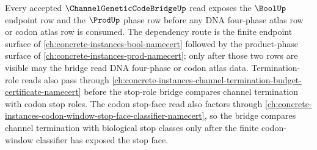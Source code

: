 \begin{lemma}
\label{lem:channel-genetic-code-bridge-finite-endpoint-dependency-route}
Every accepted $\ChannelGeneticCodeBridgeUp$ read exposes the $\BoolUp$ endpoint row and the $\ProdUp$ phase row before any DNA four-phase atlas row or codon atlas row is consumed. The dependency route is the finite endpoint surface of \autoref{ch:concrete-instances-bool-namecert} followed by the product-phase surface of \autoref{ch:concrete-instances-prod-namecert}; only after those two rows are visible may the bridge read DNA four-phase or codon atlas data. Termination-role reads also pass through \autoref{ch:concrete-instances-channel-termination-budget-certificate-namecert} before the stop-role bridge compares channel termination with codon stop roles. The codon stop-face read also factors through \autoref{ch:concrete-instances-codon-window-stop-face-classifier-namecert}, so the bridge compares channel termination with biological stop classes only after the finite codon-window classifier has exposed the stop face.
\end{lemma}

